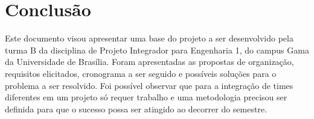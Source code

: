 \chapter{Conclusão}

Este documento visou apresentar uma base do projeto a ser desenvolvido pela turma B da disciplina de Projeto Integrador para Engenharia 1, do campus Gama da Universidade de Brasília. Foram apresentadas as propostas de organização, requisitos elicitados, cronograma  a ser seguido e possíveis soluções para o problema a ser resolvido. Foi possível observar que para a integração de times diferentes em um projeto só requer trabalho e uma metodologia precisou ser definida para que o sucesso possa ser atingido ao decorrer do semestre.
